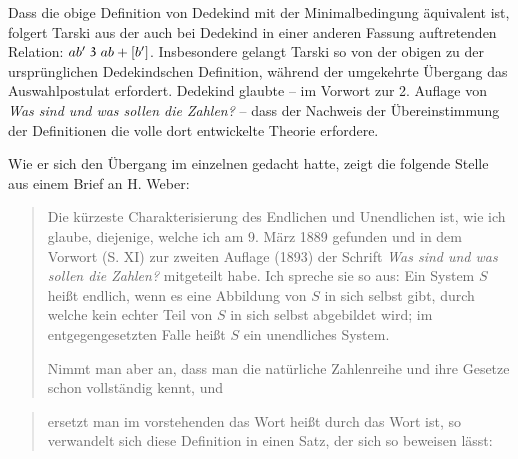 \documentclass[leqno,hidelinks]{article}
\theoremstyle{definition}
\newcommand\TeilVon{\mathrel{\raisebox{0.45ex}{$\mathfrak{3}$}}}
\begin{document}
\begin{paracol}{2}
Dass die obige Definition von Dedekind mit der Minimalbedingung äquivalent ist,
folgert Tarski aus der auch bei Dedekind in einer anderen Fassung auftretenden
Relation: $ab' \TeilVon ab + [b']$. Insbesondere gelangt Tarski so von der obigen
zu der ursprünglichen Dedekindschen Definition, während der umgekehrte Übergang
das Auswahlpostulat erfordert. Dedekind glaubte -- im Vorwort zur 2. Auflage von
\textit{\glqq Was sind und was sollen die Zahlen?\grqq{}} -- dass der Nachweis
der Übereinstimmung der Definitionen die volle dort entwickelte Theorie erfordere.

Wie er sich den Übergang im einzelnen gedacht hatte, zeigt die folgende Stelle
aus einem Brief an H. Weber:
\begin{quote}
\glqq Die kürzeste Charakterisierung des Endlichen und Unendlichen ist, wie ich
glaube, diejenige, welche ich am 9. März 1889 gefunden und in dem Vorwort (S. XI)
zur zweiten Auflage (1893) der Schrift \textit{\glqq Was sind und was sollen die
Zahlen?\grqq{}} mitgeteilt habe. Ich spreche sie so aus: \glq Ein System $S$ heißt
endlich, wenn es eine Abbildung von $S$ in sich selbst gibt, durch welche kein
echter Teil von $S$ in sich selbst abgebildet wird; im entgegengesetzten Falle
heißt $S$ ein unendliches System\grq{}.

\hspace{12pt} Nimmt man aber an, dass man die natürliche Zahlenreihe und ihre Gesetze
schon vollständig kennt, und
\end{quote}

\newpage

\begin{quote}
ersetzt man im vorstehenden das Wort \glq heißt\grq{} durch das Wort \glq ist\grq{},
so verwandelt sich diese Definition in einen Satz, der sich so beweisen lässt:


\end{quote}
\end{paracol}
\end{document}
